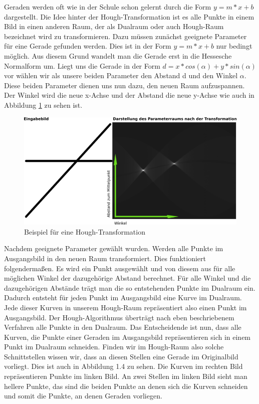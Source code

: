 \documentclass[a4paper,12pt]{article}
\begin{document}
Geraden werden oft wie in der Schule schon gelernt durch die Form 
\(y = m*x + b\) dargestellt. Die Idee hinter der Hough-Transformation ist es alle Punkte in einem Bild in einen anderen Raum, der als Dualraum oder auch Hough-Raum bezeichnet wird zu transformieren. Dazu müssen zunächst geeignete Parameter für eine Gerade gefunden werden. Dies ist in der Form
\(y = m*x + b\) nur bedingt möglich. Aus diesem Grund wandelt man die Gerade erst in die Hessesche Normalform um. Liegt uns die Gerade in der Form 
\(d = x*cos(\alpha) + y*sin(\alpha)\) vor wählen wir als unsere beiden Parameter den Abstand d und den Winkel \(\alpha\). Diese beiden Parameter dienen uns nun dazu, den neuen Raum aufzuspannen. Der Winkel wird die neue x-Achse und der Abstand die neue y-Achse wie auch in Abbildung \ref{fig:hough1} zu sehen ist.
\begin{figure}[H]
\includegraphics[scale=0.45]{hough1.png}
\caption{Beispiel für eine Hough-Transformation}
\label{fig:hough1}
\end{figure}
Nachdem geeignete Parameter gewählt wurden. Werden alle Punkte im Ausgangsbild in den neuen Raum transformiert. Dies funktioniert folgendermaßen. Es wird ein Punkt ausgewählt und von diesem aus für alle möglichen Winkel der dazugehörige Abstand berechnet. Für alle Winkel und die dazugehörigen Abstände trägt man die so entstehenden Punkte im Dualraum ein. Dadurch entsteht für jeden Punkt im Ausgangsbild eine Kurve im Dualraum. Jede dieser Kurven in unserem Hough-Raum repräsentiert also einen Punkt im Ausgangsbild. Der Hough-Algorithmus überträgt nach eben beschriebenem Verfahren alle Punkte in den Dualraum. Das Entscheidende ist nun, dass alle Kurven, die Punkte einer Geraden im Ausgangsbild repräsentieren sich in einem Punkt im Dualraum schneiden. Finden wir im Hough-Raum also solche Schnittstellen wissen wir, dass an diesen Stellen eine Gerade im Originalbild vorliegt. Dies ist auch in Abbildung 1.4 zu sehen. Die Kurven im rechten Bild repräsentieren Punkte im linken Bild. An zwei Stellen im linken Bild sieht man hellere Punkte, das sind die beiden Punkte an denen sich die Kurven schneiden und somit die Punkte, an denen Geraden vorliegen.\\
\end{document}
